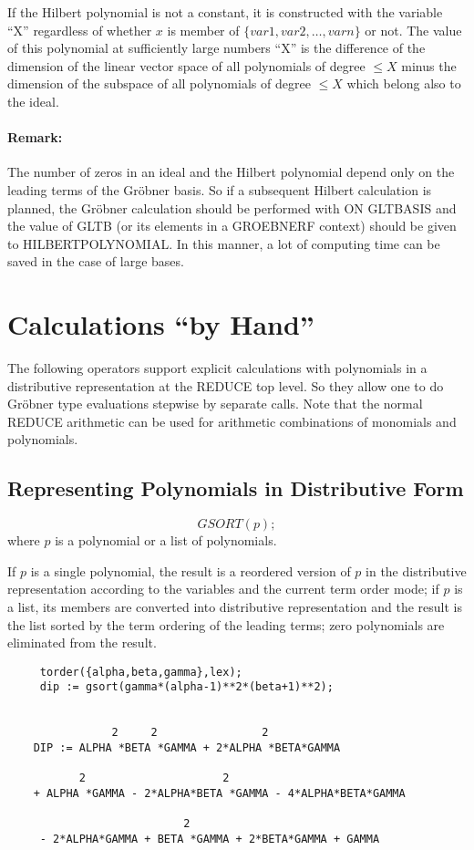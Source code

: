 If the Hilbert polynomial is not a constant, it is constructed with the
variable ``X'' regardless of whether $x$ is member of $\{var1, var2,
\ldots , varn\}$ or not. The value of this polynomial at sufficiently
large numbers  ``X''
is the difference
of the dimension of the linear vector space of all polynomials of degree
$ \leq X $ minus the dimension of the subspace of all polynomials of
degree $\leq X $ which belong also to the ideal.

\paragraph{Remark:} The number of zeros in an ideal and the
Hilbert polynomial depend only on the leading terms of the
Gr\"obner basis. So if a subsequent Hilbert calculation is planned, the
Gr\"obner calculation should be performed with ON GLTBASIS and
the value of GLTB (or its elements in a GROEBNERF context) should be
given to HILBERTPOLYNOMIAL.  In this manner, a lot of computing time can be
saved in the case of large bases.

\section{Calculations ``by Hand''}
The following operators support explicit calculations with
polynomials in a distributive representation at the REDUCE top level.
So they allow one to do Gr\"obner type evaluations stepwise by
separate calls. Note that the normal REDUCE arithmetic can be used
for arithmetic combinations of monomials and polynomials.

\subsection{Representing Polynomials in Distributive Form}
\[
 GSORT (p);
\]
where $p$ is a polynomial or a list of polynomials.

If $p$ is a single polynomial, the result is a reordered version of $p$
in the distributive representation according to the variables and the
current term order mode; if $p$ is a list, its members are converted
into distributive representation and the result is the list sorted by
the term ordering of the leading terms; zero polynomials are
eliminated from the result.

\begin{verbatim}
     torder({alpha,beta,gamma},lex);
     dip := gsort(gamma*(alpha-1)**2*(beta+1)**2);


                2     2                2
    DIP := ALPHA *BETA *GAMMA + 2*ALPHA *BETA*GAMMA

           2                     2
    + ALPHA *GAMMA - 2*ALPHA*BETA *GAMMA - 4*ALPHA*BETA*GAMMA

                           2
     - 2*ALPHA*GAMMA + BETA *GAMMA + 2*BETA*GAMMA + GAMMA

 \end{verbatim}


